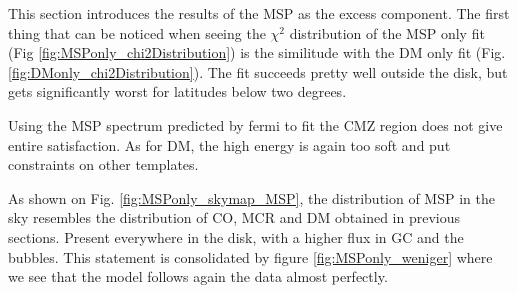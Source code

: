 This section introduces the results of the MSP as the excess component.
The first thing that can be noticed when seeing the $\chi^2$ distribution of the MSP only fit (Fig \ref{fig:MSPonly_chi2Distribution}) is the similitude with the DM only fit (Fig. \ref{fig:DMonly_chi2Distribution}). The fit succeeds pretty well outside the disk, but gets significantly worst for latitudes below two degrees.


Using the MSP spectrum predicted by fermi \cite{Fermi2017} to fit the CMZ region does not give entire satisfaction.
As for DM, the high energy is again too soft and put constraints on other templates.


As shown on Fig. \ref{fig:MSPonly_skymap_MSP}, the distribution of MSP in the sky resembles the distribution of CO, MCR and DM obtained in previous sections. Present everywhere in the disk, with a higher flux in GC and the bubbles. This statement is consolidated by figure \ref{fig:MSPonly_weniger} where we see that the model follows again the data almost perfectly.

